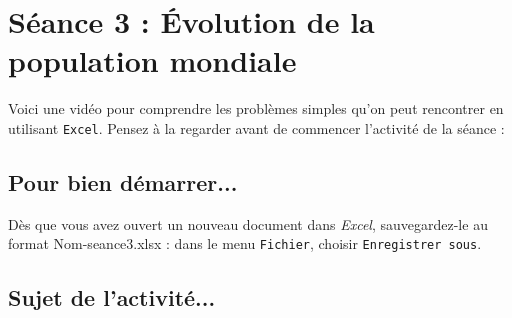 \newpage



%
%
%
%




\section{Séance 3 : Évolution de la population mondiale}\label{ficheTableur3}

Voici une vidéo pour comprendre les problèmes simples qu'on peut rencontrer en utilisant \texttt{Excel}. Pensez à la regarder avant de commencer l'activité de la séance :

\begin{center}
\end{center}

\subsection{Pour bien démarrer...}

Dès que vous avez ouvert un nouveau document dans \emph{Excel}, sauvegardez-le au format Nom-seance3.xlsx : dans le menu \texttt{Fichier}, choisir \texttt{Enregistrer sous}. 


\subsection{Sujet de l'activité...}

